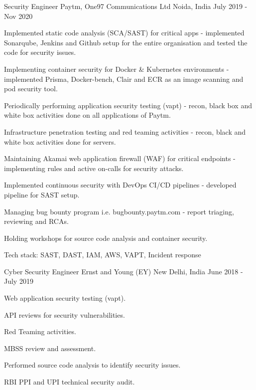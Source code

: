 \begin{cventries}
  \cventry
    {Security Engineer} %
    {Paytm, One97 Communications Ltd} %
    {Noida, India} %
    {July 2019 - Nov 2020} %
    {
      \begin{cvitems} %
        \item {Implemented static code analysis (SCA/SAST) for critical apps - implemented Sonarqube, Jenkins and Github setup for the entire organisation and tested the code for security issues.}
        \item {Implementing container security for Docker \& Kubernetes environments - implemented Prisma, Docker-bench, Clair and ECR as an image scanning and pod security tool.}
        \item {Periodically performing application security testing (vapt) - recon, black box and white box activities done on all applications of Paytm.}
        \item {Infrastructure penetration testing and red teaming activities - recon, black and white box activities done for servers.}
        \item {Maintaining Akamai web application firewall (WAF) for critical endpoints - implementing rules and active on-calls for security attacks.}
        \item {Implemented continuous security with DevOps CI/CD pipelines - developed pipeline for SAST setup.}
        \item {Managing bug bounty program i.e. bugbounty.paytm.com - report triaging, reviewing and RCAs.}
        \item {Holding workshops for source code analysis and container security.}
        \item {Tech stack: SAST, DAST, IAM, AWS, VAPT, Incident response}
      \end{cvitems}
    }

  \cventry
    {Cyber Security Engineer} %
    {Ernst and Young (EY)} %
    {New Delhi, India} %
    {June 2018 - July 2019} %
    {
      \begin{cvitems} %
        \item {Web application security testing (vapt).}
        \item {API reviews for security vulnerabilities.}
        \item {Red Teaming activities.}
        \item {MBSS review and assessment.}
        \item {Performed source code analysis to identify security issues.}
        \item {RBI PPI and UPI technical security audit.}
      \end{cvitems}
    }


\end{cventries}
